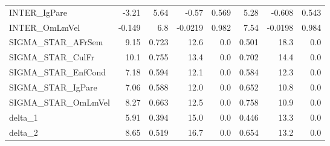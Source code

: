 \begin{tabular}{lrrrrrrr}
INTER\_IgPare       &   -3.21 &     5.64 &    -0.57 &    0.569 &          5.28 &       -0.608 &         0.543 \\
INTER\_OmLmVel      &  -0.149 &      6.8 &  -0.0219 &    0.982 &          7.54 &      -0.0198 &         0.984 \\
SIGMA\_STAR\_AFrSem  &    9.15 &    0.723 &     12.6 &      0.0 &         0.501 &         18.3 &           0.0 \\
SIGMA\_STAR\_CulFr   &    10.1 &    0.755 &     13.4 &      0.0 &         0.702 &         14.4 &           0.0 \\
SIGMA\_STAR\_EnfCond &    7.18 &    0.594 &     12.1 &      0.0 &         0.584 &         12.3 &           0.0 \\
SIGMA\_STAR\_IgPare  &    7.06 &    0.588 &     12.0 &      0.0 &         0.652 &         10.8 &           0.0 \\
SIGMA\_STAR\_OmLmVel &    8.27 &    0.663 &     12.5 &      0.0 &         0.758 &         10.9 &           0.0 \\
delta\_1            &    5.91 &    0.394 &     15.0 &      0.0 &         0.446 &         13.3 &           0.0 \\
delta\_2            &    8.65 &    0.519 &     16.7 &      0.0 &         0.654 &         13.2 &           0.0 \\
\bottomrule
\end{tabular}

